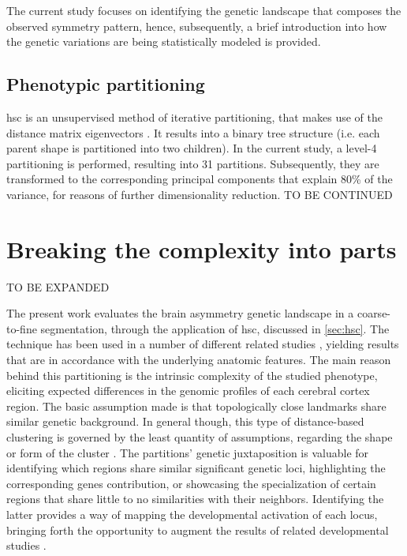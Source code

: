 The current study focuses on identifying the genetic landscape that composes the observed symmetry pattern, hence, subsequently, a brief introduction into how the genetic variations are being statistically modeled is provided.




\citet{Sha2021}


\subsection{Phenotypic partitioning}\label{sec:hsc}
\Acf{hsc} is an unsupervised method of iterative partitioning, that makes use of the distance matrix eigenvectors \cite{Ng2002}. It results into a binary tree structure (i.e. each parent shape is partitioned into two children). In the current study, a level-4 partitioning is performed, resulting into 31 partitions. Subsequently, they are transformed to the corresponding principal components that explain 80\% of the variance, for reasons of further dimensionality reduction. TO BE CONTINUED




\section{Breaking the complexity into parts}
TO BE EXPANDED

The present work evaluates the brain asymmetry genetic landscape in a coarse-to-fine segmentation, through the application of \ac{hsc}\cite{Ng2002}, discussed in \autoref{sec:hsc}. The technique has been used in a number of different related studies \cite{Claes2018}\cite{Naqvi2021}, yielding results that are in accordance with the underlying anatomic features. The main reason behind this partitioning is the intrinsic complexity of the studied phenotype, eliciting expected differences in the genomic profiles of each cerebral cortex region. The basic assumption made is that topologically close landmarks share similar genetic background. In general though, this type of distance-based clustering is governed by the least quantity of assumptions, regarding the shape or form of the cluster \cite{VonLuxburg2007}. The partitions' genetic juxtaposition is valuable for identifying which regions share similar significant genetic loci, highlighting the corresponding genes contribution, or showcasing the specialization of certain regions that share little to no similarities with their neighbors. Identifying the latter provides a way of mapping the developmental activation of each locus, bringing forth the opportunity to augment the results of related developmental studies \cite{Vijayakumar2016}.

